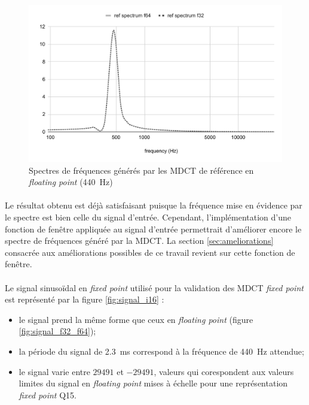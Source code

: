 \documentclass{article}
\begin{document}
    \begin{figure}[H]
        \centering
        \includegraphics[width=.8\linewidth]{./images/validation_ref_float.pdf}
        \caption{Spectres de fréquences générés par les MDCT de référence en \emph{floating point} (\SI{440}{\hertz})}
        \label{fig:validation_ref_mdct_float}
    \end{figure}

    \paragraph{}
    Le résultat obtenu est déjà satisfaisant puisque la fréquence mise en évidence par le spectre est bien celle du signal d'entrée. Cependant, l'implémentation d'une fonction de fenêtre appliquée au signal d'entrée permettrait d'améliorer encore le spectre de fréquences généré par la MDCT. La section \ref{sec:ameliorations} consacrée aux améliorations possibles de ce travail revient sur cette fonction de fenêtre.

    \paragraph{}
    Le signal sinusoïdal en \emph{fixed point} utilisé pour la validation des MDCT \emph{fixed point} est représenté par la figure \ref{fig:signal_i16} :
    \begin{itemize}
        \item le signal prend la même forme que ceux en \emph{floating point} (figure \ref{fig:signal_f32_f64});
        \item la période du signal de \SI{2.3}{\milli\second} correspond à la fréquence de \SI{440}{\hertz} attendue;
        \item le signal varie entre $29491$ et $-29491$, valeurs qui corespondent aux valeurs limites du signal en \emph{floating point} mises à échelle pour une représentation \emph{fixed point} Q15.
    \end{itemize}
\end{document}
